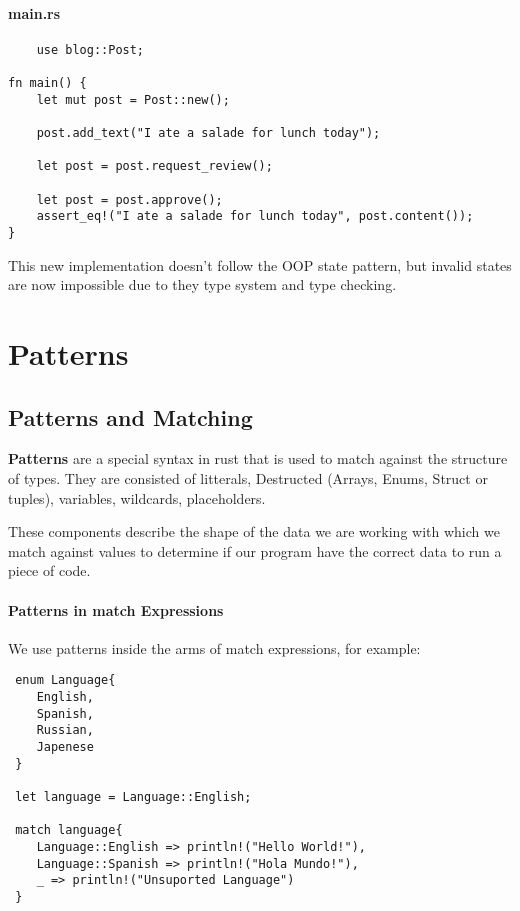 \paragraph*{main.rs}\begin{lstlisting}
    use blog::Post;

fn main() {
    let mut post = Post::new();

    post.add_text("I ate a salade for lunch today");

    let post = post.request_review();

    let post = post.approve();
    assert_eq!("I ate a salade for lunch today", post.content());
}
\end{lstlisting}

This new implementation doesn't follow the OOP state pattern, but invalid states are now impossible due to they type system and type checking.

\section{Patterns}

\subsection{Patterns and Matching}
\begin{definition}
    \textbf{Patterns} are a special syntax in rust that is used to match against the structure of types. They are consisted of litterals, Destructed (Arrays, Enums, Struct or tuples), variables, wildcards, placeholders. 
\end{definition}
These components describe the shape of the data we are working with which we match against values to determine if our program have the correct data to run a piece of code.

\paragraph*{Patterns in match Expressions}
We use patterns inside the arms of match expressions, for example:\begin{lstlisting}
 enum Language{
    English,
    Spanish,
    Russian,
    Japenese
 }

 let language = Language::English;

 match language{
    Language::English => println!("Hello World!"),
    Language::Spanish => println!("Hola Mundo!"),
    _ => println!("Unsuported Language")
 }
\end{lstlisting}

